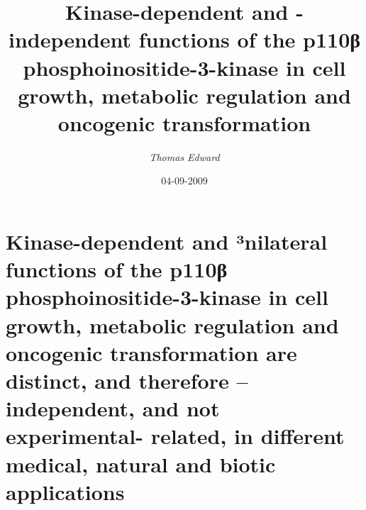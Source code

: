 \documentclass{article}%
\title{Kinase{-}dependent and {-}independent functions of the p110β phosphoinositide{-}3{-}kinase in cell growth, metabolic regulation and oncogenic transformation}%
\author{\textit{Thomas Edward}}%
\date{04-09-2009}%
\begin{document}
%
\normalsize%
\maketitle%
\section{Kinase{-}dependent and ³nilateral functions of the p110β phosphoinositide{-}3{-}kinase in cell growth, metabolic regulation and oncogenic transformation are distinct, and therefore – independent, and not experimental{-} related, in different medical, natural and biotic applications}%
\label{sec:Kinase{-}dependentandnilateralfunctionsofthep110phosphoinositide{-}3{-}kinaseincellgrowth,metabolicregulationandoncogenictransformationaredistinct,andthereforeindependent,andnotexperimental{-}related,indifferentmedical,naturalandbioticapplications}%
\end{document}
